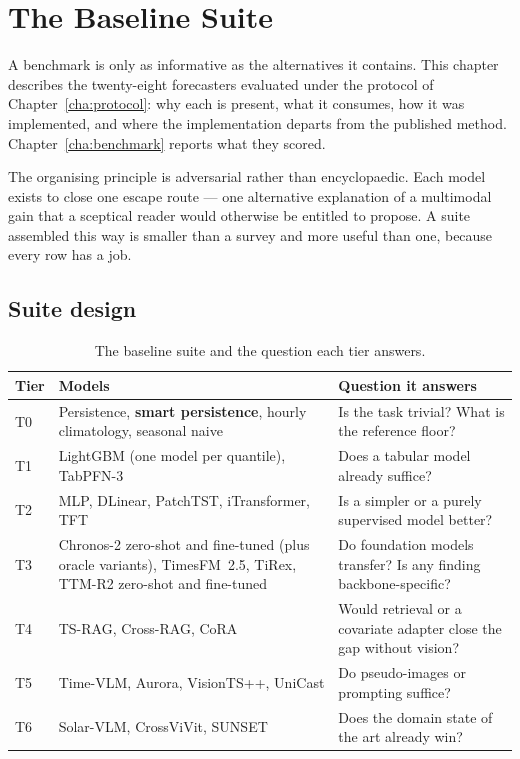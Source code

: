 \chapter{The Baseline Suite}
\label{cha:baselines}

A benchmark is only as informative as the alternatives it contains. This chapter describes
the twenty-eight forecasters evaluated under the protocol of Chapter~\ref{cha:protocol}:
why each is present, what it consumes, how it was implemented, and where the
implementation departs from the published method. Chapter~\ref{cha:benchmark} reports what
they scored.

The organising principle is adversarial rather than encyclopaedic. Each model exists to
close one escape route --- one alternative explanation of a multimodal gain that a
sceptical reader would otherwise be entitled to propose. A suite assembled this way is
smaller than a survey and more useful than one, because every row has a job.

\section{Suite design}
\label{sec:suite-design}

\begin{table}[h!]
\centering
\small
\begin{tabular}{p{1.2cm} p{6.4cm} p{5.8cm}}
\hline
\textbf{Tier} & \textbf{Models} & \textbf{Question it answers} \\
\hline
T0 & Persistence, \textbf{smart persistence}, hourly climatology, seasonal naive &
Is the task trivial? What is the reference floor? \\
T1 & LightGBM (one model per quantile), TabPFN-3 & Does a tabular model already suffice? \\
T2 & MLP, DLinear, PatchTST, iTransformer, TFT & Is a simpler or a purely supervised model
better? \\
T3 & Chronos-2 zero-shot and fine-tuned (plus oracle variants), TimesFM~2.5, TiRex, TTM-R2
zero-shot and fine-tuned & Do foundation models transfer? Is any finding
backbone-specific? \\
T4 & TS-RAG, Cross-RAG, CoRA & Would retrieval or a covariate adapter close the gap without
vision? \\
T5 & Time-VLM, Aurora, VisionTS++, UniCast & Do pseudo-images or prompting suffice? \\
T6 & Solar-VLM, CrossViVit, SUNSET & Does the domain state of the art already win? \\
\hline
\end{tabular}
\caption{The baseline suite and the question each tier answers.}
\label{tab:suite}
\end{table}

